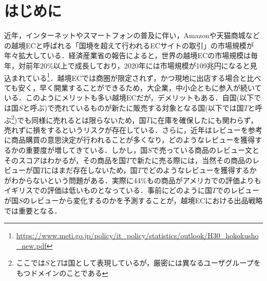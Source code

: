 \documentclass[dvipdfmx,twocolumn,10.5pt]{jsarticle}
\begin{document}
\section{はじめに}
近年，インターネットやスマートフォンの普及に伴い，Amazonや天猫商城などの越境ECと呼ばれる「国境を超えて行われるECサイトの取引」の市場規模が年々拡大している．経済産業省の報告によると，世界の越境ECの市場規模は毎年，対前年$20\%$以上で成長しており，2020年には市場規模が109兆円になると見込まれている\footnote{\url{https://www.meti.go.jp/policy/it_policy/statistics/outlook/H30_hokokusho_new.pdf}}．越境ECでは商圏が限定されず，かつ現地に出店する場合と比べても安く，早く開業することができるため，大企業，中小企ともに参入が続いている．このようにメリットも多い越境ECだが，デメリットもある．自国(以下では国$S$と呼ぶ)で売れているものが新たに販売する対象となる国(以下では国$T$と呼ぶ\footnote{ここでは$S$と$T$は国として表現しているが，厳密には異なるユーザグループをもつドメインのことである})でも同様に売れるとは限らないため，国$T$に在庫を確保したにも関わらず，売れずに損をするというリスクが存在している．さらに，近年はレビューを参考に商品購買の意思決定が行われることが多くなり，どのようなレビューを獲得するかの重要度が増してきている．しかし，国$S$で売っている商品のレビュー文とそのスコアはわかるが，その商品を国$T$で新たに売る際には，当然その商品のレビューが国$T$にはまだ存在しないため，国$T$でどのようなレビューを獲得するかがわからないという問題がある．実際に44\%もの商品がアメリカでの評価よりもイギリスでの評価は低いものとなっている．事前にどのように国$T$でのレビューが国$S$のレビューから変化するのかを予測することが，越境ECにおける出品戦略では重要となる．
\end{document}
